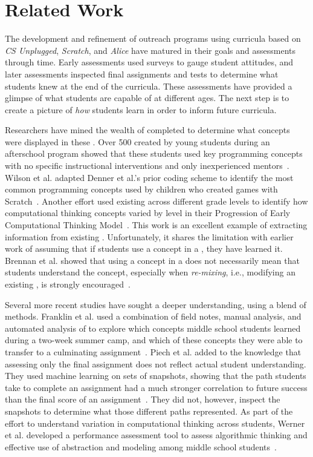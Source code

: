 \section{Related Work}
The development and refinement of outreach programs using curricula based on
\emph{CS Unplugged}, \emph{Scratch}, and \emph{Alice} have matured in their
goals and assessments through time. Early assessments used surveys to gauge
student attitudes, and later assessments inspected final assignments and tests
to determine what students knew at the end of the curricula. These assessments
have provided a glimpse of what students are capable of at different ages. The
next step is to create a picture of \emph{how} students learn in order to
inform future curricula.

Researchers have mined the wealth of completed  to determine what
concepts were displayed in these . Over 500  created by
young students during an afterschool program showed that these students used
key programming concepts with no specific instructional interventions and only
inexperienced mentors~\cite{Maloney:2008:PCU:1352135.1352260}. Wilson et
al. adapted Denner et al.'s prior coding scheme to identify the most common
programming concepts used by children who created games with
Scratch~\cite{Denner:2012:CGC:2072695.2073050, wilson12}. Another effort used
existing  across different grade levels to identify how
computational thinking concepts varied by level in their Progression of Early
Computational Thinking Model~\cite{Seiter:2013:MLP:2493394.2493403}. This work
is an excellent example of extracting information from existing
. Unfortunately, it shares the limitation with earlier work of
assuming that if students use a concept in a \sprogram{}, they have learned
it. Brennan et al. showed that using a concept in a \sprogram{} does not
necessarily mean that students understand the concept, especially when
\emph{re-mixing}, i.e., modifying an existing \sprogram{}, is strongly
encouraged~\cite{brennan12}.

Several more recent studies have sought a deeper understanding, using a blend
of methods. Franklin et al. used a combination of field notes, manual analysis,
and automated analysis of  to explore which concepts middle school
students learned during a two-week summer camp, and which of these concepts
they were able to transfer to a culminating
assignment~\cite{Boe:2013:HLS:2445196.2445265, Franklin:2013:SBO}. Piech et
al. added to the knowledge that assessing only the final assignment does not
reflect actual student understanding. They used machine learning on sets of
snapshots, showing that the path students take to complete an assignment had a
much stronger correlation to future success than the final score of an
assignment~\cite{Piech:2012:MSL:2157136.2157182}. They did not, however,
inspect the snapshots to determine what those different paths represented. As
part of the effort to understand variation in computational thinking across
students, Werner et al. developed a performance assessment tool to assess
algorithmic thinking and effective use of abstraction and modeling among middle
school students~\cite{Werner:2012:FPA:2157136.2157200}.

